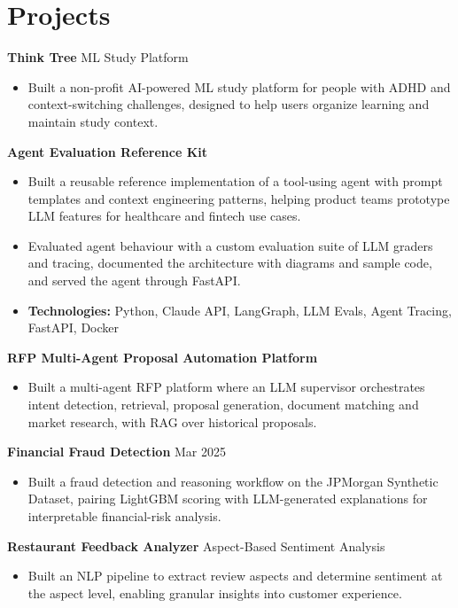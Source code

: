 \documentclass[10pt,a4paper]{article}
\begin{document}
\section{Projects}
\textbf{Think Tree} \textbar{} ML Study Platform\par
\begin{itemize}
  \item Built a non-profit AI-powered ML study platform for people with ADHD and context-switching challenges, designed to help users organize learning and maintain study context.
\end{itemize}
\textbf{Agent Evaluation Reference Kit}\par
\begin{itemize}
  \item Built a reusable reference implementation of a tool-using agent with prompt templates and context engineering patterns, helping product teams prototype LLM features for healthcare and fintech use cases.
  \item Evaluated agent behaviour with a custom evaluation suite of LLM graders and tracing, documented the architecture with diagrams and sample code, and served the agent through FastAPI.
  \item \textbf{Technologies:} Python, Claude API, LangGraph, LLM Evals, Agent Tracing, FastAPI, Docker
\end{itemize}
\textbf{RFP Multi-Agent Proposal Automation Platform}\par
\begin{itemize}
  \item Built a multi-agent RFP platform where an LLM supervisor orchestrates intent detection, retrieval, proposal generation, document matching and market research, with RAG over historical proposals.
\end{itemize}
\textbf{Financial Fraud Detection} \textbar{} Mar 2025\par
\begin{itemize}
  \item Built a fraud detection and reasoning workflow on the JPMorgan Synthetic Dataset, pairing LightGBM scoring with LLM-generated explanations for interpretable financial-risk analysis.
\end{itemize}
\textbf{Restaurant Feedback Analyzer} \textbar{} Aspect-Based Sentiment Analysis\par
\begin{itemize}
  \item Built an NLP pipeline to extract review aspects and determine sentiment at the aspect level, enabling granular insights into customer experience.
\end{itemize}
\end{document}
